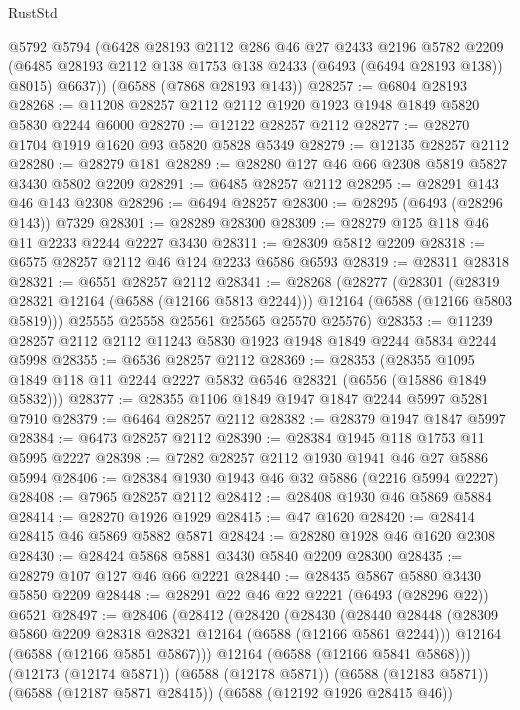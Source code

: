 \begin{lexlean}{RustStd}
\begin{coremodule}
      @5792
      @5794
      (@6428
        @28193
        @2112
        @286
        @46
        @27
        @2433
        @2196
        @5782
        @2209
        (@6485 @28193 @2112 @138 @1753 @138 @2433 (@6493 (@6494 @28193 @138)) @8015)
        @6637))
    (@6588 (@7868 @28193 @143))
@28257 := @6804 @28193
@28268 := @11208 @28257 @2112 @2112 @1920 @1923 @1948 @1849 @5820 @5830 @2244 @6000
@28270 := @12122 @28257 @2112
@28277 := @28270 @1704 @1919 @1620 @93 @5820 @5828 @5349
@28279 := @12135 @28257 @2112
@28280 := @28279 @181
@28289 := @28280 @127 @46 @66 @2308 @5819 @5827 @3430 @5802 @2209
@28291 := @6485 @28257 @2112
@28295 := @28291 @143 @46 @143 @2308
@28296 := @6494 @28257
@28300 := @28295 (@6493 (@28296 @143)) @7329
@28301 := @28289 @28300
@28309 := @28279 @125 @118 @46 @11 @2233 @2244 @2227 @3430
@28311 := @28309 @5812 @2209
@28318 := @6575 @28257 @2112 @46 @124 @2233 @6586 @6593
@28319 := @28311 @28318
@28321 := @6551 @28257 @2112
@28341 := @28268
    (@28277
      (@28301
        (@28319 @28321 @12164 (@6588 (@12166 @5813 @2244)))
        @12164
        (@6588 (@12166 @5803 @5819)))
      @25555
      @25558
      @25561
      @25565
      @25570
      @25576)
@28353 := @11239 @28257 @2112 @2112 @11243 @5830 @1923 @1948 @1849 @2244 @5834 @2244 @5998
@28355 := @6536 @28257 @2112
@28369 := @28353
    (@28355 @1095 @1849 @118 @11 @2244 @2227 @5832 @6546 @28321 (@6556 (@15886 @1849 @5832)))
@28377 := @28355 @1106 @1849 @1947 @1847 @2244 @5997 @5281 @7910
@28379 := @6464 @28257 @2112
@28382 := @28379 @1947 @1847 @5997
@28384 := @6473 @28257 @2112
@28390 := @28384 @1945 @118 @1753 @11 @5995 @2227
@28398 := @7282 @28257 @2112 @1930 @1941 @46 @27 @5886 @5994
@28406 := @28384 @1930 @1943 @46 @32 @5886 (@2216 @5994 @2227)
@28408 := @7965 @28257 @2112
@28412 := @28408 @1930 @46 @5869 @5884
@28414 := @28270 @1926 @1929
@28415 := @47 @1620
@28420 := @28414 @28415 @46 @5869 @5882 @5871
@28424 := @28280 @1928 @46 @1620 @2308
@28430 := @28424 @5868 @5881 @3430 @5840 @2209 @28300
@28435 := @28279 @107 @127 @46 @66 @2221
@28440 := @28435 @5867 @5880 @3430 @5850 @2209
@28448 := @28291 @22 @46 @22 @2221 (@6493 (@28296 @22)) @6521
@28497 := @28406
    (@28412
      (@28420
        (@28430
          (@28440
            @28448
            (@28309 @5860 @2209 @28318 @28321 @12164 (@6588 (@12166 @5861 @2244)))
            @12164
            (@6588 (@12166 @5851 @5867)))
          @12164
          (@6588 (@12166 @5841 @5868)))
        (@12173 (@12174 @5871))
        (@6588 (@12178 @5871))
        (@6588 (@12183 @5871))
        (@6588 (@12187 @5871 @28415))
        (@6588 (@12192 @1926 @28415 @46))

\end{coremodule}
\end{lexlean}
